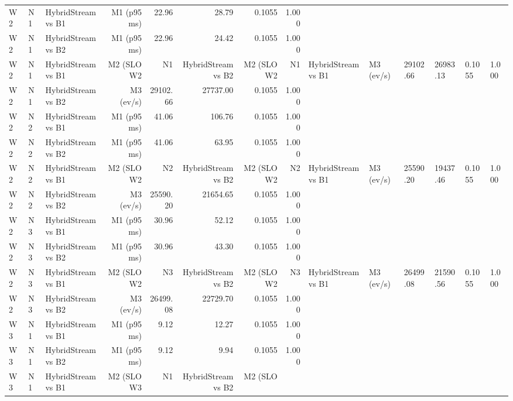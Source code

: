 \begin{table}[htbp]
\begin{tabular}{lllrrrrr}
W2 & N1 & HybridStream vs B1 & M1 (p95 ms) & 22.96 & 28.79 & 0.1055 & 1.000 \\
W2 & N1 & HybridStream vs B2 & M1 (p95 ms) & 22.96 & 24.42 & 0.1055 & 1.000 \\
W2 & N1 & HybridStream vs B1 & M2 (SLO %
W2 & N1 & HybridStream vs B2 & M2 (SLO %
W2 & N1 & HybridStream vs B1 & M3 (ev/s) & 29102.66 & 26983.13 & 0.1055 & 1.000 \\
W2 & N1 & HybridStream vs B2 & M3 (ev/s) & 29102.66 & 27737.00 & 0.1055 & 1.000 \\
W2 & N2 & HybridStream vs B1 & M1 (p95 ms) & 41.06 & 106.76 & 0.1055 & 1.000 \\
W2 & N2 & HybridStream vs B2 & M1 (p95 ms) & 41.06 & 63.95 & 0.1055 & 1.000 \\
W2 & N2 & HybridStream vs B1 & M2 (SLO %
W2 & N2 & HybridStream vs B2 & M2 (SLO %
W2 & N2 & HybridStream vs B1 & M3 (ev/s) & 25590.20 & 19437.46 & 0.1055 & 1.000 \\
W2 & N2 & HybridStream vs B2 & M3 (ev/s) & 25590.20 & 21654.65 & 0.1055 & 1.000 \\
W2 & N3 & HybridStream vs B1 & M1 (p95 ms) & 30.96 & 52.12 & 0.1055 & 1.000 \\
W2 & N3 & HybridStream vs B2 & M1 (p95 ms) & 30.96 & 43.30 & 0.1055 & 1.000 \\
W2 & N3 & HybridStream vs B1 & M2 (SLO %
W2 & N3 & HybridStream vs B2 & M2 (SLO %
W2 & N3 & HybridStream vs B1 & M3 (ev/s) & 26499.08 & 21590.56 & 0.1055 & 1.000 \\
W2 & N3 & HybridStream vs B2 & M3 (ev/s) & 26499.08 & 22729.70 & 0.1055 & 1.000 \\
W3 & N1 & HybridStream vs B1 & M1 (p95 ms) & 9.12 & 12.27 & 0.1055 & 1.000 \\
W3 & N1 & HybridStream vs B2 & M1 (p95 ms) & 9.12 & 9.94 & 0.1055 & 1.000 \\
W3 & N1 & HybridStream vs B1 & M2 (SLO %
W3 & N1 & HybridStream vs B2 & M2 (SLO %

\end{tabular}
\end{table}

